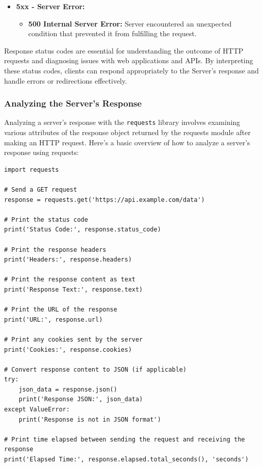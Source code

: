 \begin{itemize}
    \item \textbf{5xx - Server Error:}
    \begin{itemize}
        \item \textbf{500 Internal Server Error:} Server encountered an unexpected condition that prevented it from fulfilling the request.
    \end{itemize}
\end{itemize}




Response status codes are essential for understanding the outcome of HTTP requests and diagnosing issues with web applications and APIs. By interpreting these status codes, clients can respond appropriately to the Server's response and handle errors or redirections effectively.

\newpage
\subsubsection{Analyzing the Server's Response}
Analyzing a server's response with the \texttt{requests} library involves examining various attributes of the response object returned by the requests module after making an HTTP request. Here's a basic overview of how to analyze a server's response using requests:

\begin{codebox}
\begin{verbatim}
import requests

# Send a GET request
response = requests.get('https://api.example.com/data')

# Print the status code
print('Status Code:', response.status_code)

# Print the response headers
print('Headers:', response.headers)

# Print the response content as text
print('Response Text:', response.text)

# Print the URL of the response
print('URL:', response.url)

# Print any cookies sent by the server
print('Cookies:', response.cookies)

# Convert response content to JSON (if applicable)
try:
    json_data = response.json()
    print('Response JSON:', json_data)
except ValueError:
    print('Response is not in JSON format')

# Print time elapsed between sending the request and receiving the response
print('Elapsed Time:', response.elapsed.total_seconds(), 'seconds')
\end{verbatim}
\end{codebox}
